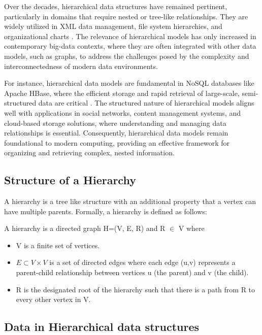 Over the decades, hierarchical data structures have remained pertinent, particularly in domains that require nested or tree-like relationships. They are widely utilized in XML data management, file system hierarchies, and organizational charts \cite{DBLP:books/mk/BunemanSA99}. The relevance of hierarchical models has only increased in contemporary big-data contexts, where they are often integrated with other data models, such as graphs, to address the challenges posed by the complexity and interconnectedness of modern data environments.

For instance, hierarchical data models are fundamental in NoSQL databases like Apache HBase, where the efficient storage and rapid retrieval of large-scale, semi-structured data are critical \cite{DBLP:books/daglib/0027893}. The structured nature of hierarchical models aligns well with applications in social networks, content management systems, and cloud-based storage solutions, where understanding and managing data relationships is essential.
Consequently, hierarchical data models remain foundational to modern computing, providing an effective framework for organizing and retrieving complex, nested information.

\subsection{Structure of a Hierarchy}
A hierarchy is a tree like structure with an additional property that a vertex can have multiple parents.
Formally, a hierarchy is defined as follows:

\begin{definition}
    A hierarchy is a directed graph H=(V, E, R) and R $\in$ V where
    \begin{itemize}
        \item V is a finite set of vertices.
        \item $E \subset V \times V$ is a set of directed edges where each edge (u,v) represents a parent-child relationship between vertices u (the parent) and v (the child).
        \item R is the designated root of the hierarchy such that there is a path from R to every other vertex in V.
        
    \end{itemize} 
\end{definition}

\subsection{Data in Hierarchical data structures}

